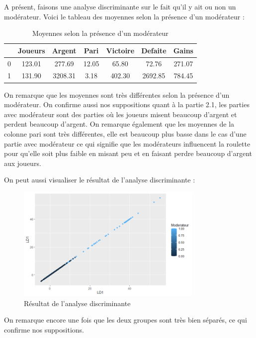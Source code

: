 \documentclass[a4paper, 12pt]{article}
\theoremstyle{exo}
\begin{document}
A présent, faisons une analyse discriminante sur le fait qu'il y ait ou non un modérateur. Voici le tableau des moyennes selon la présence d'un modérateur :

\begin{table}[ht]
\centering
\begin{tabular}{ccccccc}
    \hline
    & Joueurs & Argent & Pari & Victoire & Defaite & Gains \\ 
    \hline
0 & 123.01 & 277.69 & 12.05 & 65.80 & 72.76 & 271.07 \\ 
    1 & 131.90 & 3208.31 & 3.18 & 402.30 & 2692.85 & 784.45 \\ 
    \hline
\end{tabular}
\caption{Moyennes selon la présence d'un modérateur}
\end{table}

\noindent On remarque que les moyennes sont très différentes selon la présence d'un modérateur. On confirme aussi nos suppositions quant à la partie 2.1, les parties avec modérateur sont des parties où les joueurs misent beaucoup d'argent et perdent beaucoup d'argent. On remarque également que les moyennes de la colonne pari sont très différentes, elle est beaucoup plus basse dans le cas d'une partie avec modérateur ce qui signifie que les modérateurs influencent la roulette pour qu'elle soit plus faible en misant peu et en faisant perdre beaucoup d'argent aux joueurs.

\newpage

On peut aussi visualiser le résultat de l'analyse discriminante :

\begin{figure}[H]
\centering
\includegraphics[width=0.8\textwidth]{figures/Predict.png}
\caption{Résultat de l'analyse discriminante}
\end{figure}

\noindent On remarque encore une fois que les deux groupes sont très bien séparés, ce qui confirme nos suppositions.
\end{document}
